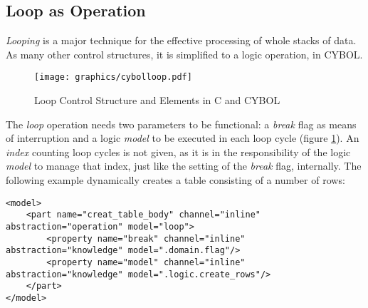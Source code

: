 %
%
%
%
%
%

\subsection{Loop as Operation}
\label{loop_as_operation_heading}

\emph{Looping} is a major technique for the effective processing of whole
stacks of data. As many other control structures, it is simplified to a logic
operation, in CYBOL.

\begin{figure}[ht]
    \begin{center}
        \texttt{[image: graphics/cybolloop.pdf]}
        \caption{Loop Control Structure and Elements in C and CYBOL}
        \label{cybolloop_figure}
    \end{center}
\end{figure}

The \emph{loop} operation needs two parameters to be functional: a \emph{break}
flag as means of interruption and a logic \emph{model} to be executed in each
loop cycle (figure \ref{cybolloop_figure}). An \emph{index} counting loop
cycles is not given, as it is in the responsibility of the logic \emph{model}
to manage that index, just like the setting of the \emph{break} flag,
internally. The following example dynamically creates a table consisting of a
number of rows:

\begin{scriptsize}
    \begin{verbatim}
<model>
    <part name="creat_table_body" channel="inline" abstraction="operation" model="loop">
        <property name="break" channel="inline" abstraction="knowledge" model=".domain.flag"/>
        <property name="model" channel="inline" abstraction="knowledge" model=".logic.create_rows"/>
    </part>
</model>
    \end{verbatim}
\end{scriptsize}
